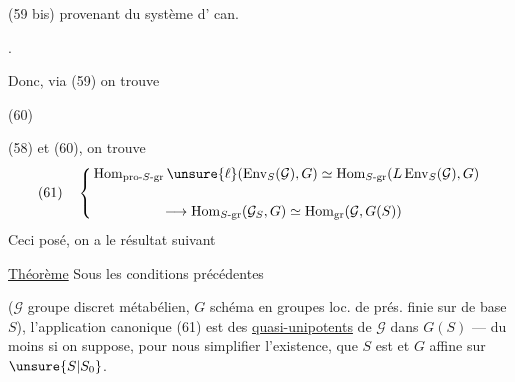 (59 bis)\quad
{}
provenant du système d' can.



.

Donc, via (59) on trouve

(60)\quad
{}


 (58) et (60), on trouve
\[
(61)\quad\left\{
\begin{aligned}
&\operatorname{Hom}_{\mathrm{pro}\text{-}S\text{-}\mathrm{gr}}\unsure{\ell}
 (\operatorname{Env}_S(\mathcal{G}),G)
 \simeq\operatorname{Hom}_{S\text{-}\mathrm{gr}}(L\operatorname{Env}_S(\mathcal{G}),G)\\[1.2em]
&\hspace{5em}\longrightarrow\operatorname{Hom}_{S\text{-}\mathrm{gr}}(\mathcal{G}_S,G)
 \simeq\operatorname{Hom}_{\mathrm{gr}}(\mathcal{G},G(S))
\end{aligned}\right.
\]
Ceci posé, on a le résultat suivant

\uline{Théorème}  Sous les conditions précédentes

($\mathcal{G}$ groupe discret métabélien, $G$ schéma en groupes loc. de prés. finie sur  de base $S$), l'application canonique (61) est    des  \uline{quasi-unipotents} de $\mathcal{G}$ dans $G(S)$ --- du moins si on suppose, pour nous simplifier l'existence, que $S$ est  et $G$ affine sur $\unsure{S|S_0}$.

